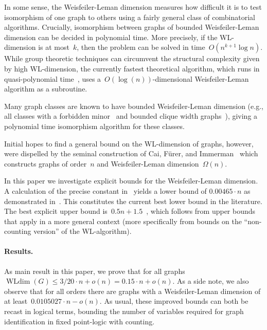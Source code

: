 \documentclass[english,a4paper]{article}
\theoremstyle{plain}
\theoremstyle{definition}
\DeclareMathOperator*{\WLdim}{WLdim}
\newcommand{\wldim}[1]{\ensuremath{\WLdim\left(#1\right)}}
\begin{document}
In some sense, the Weisfeiler-Leman dimension measures how difficult it is to test isomorphism of one graph to others using a fairly general class of combinatorial algorithms.
Crucially, isomorphism between graphs of bounded Weisfeiler-Leman dimension can be decided in polynomial time. More precisely, if the WL-dimension is at most~$k$, then the problem can be solved in time~$O(n^{k+1}\log n)$.
While group theoretic techniques can circumvent the structural complexity given by high WL-dimension, the currently fastest theoretical algorithm, which runs in quasi-polynomial time~\cite{DBLP:conf/stoc/Babai16}, uses a~$O(\log(n))$-dimensional Weisfeiler-Leman algorithm as a subroutine.

Many graph classes are known to have bounded Weisfeiler-Leman dimension (e.g., all classes with a forbidden minor~\cite{DBLP:books/cu/G2017} and bounded clique width graphs~\cite{DBLP:journals/tocl/GroheN23}), giving a polynomial time isomorphism algorithm for these classes.

Initial hopes to find a general bound on the WL-dimension
of graphs, however, were dispelled by the seminal construction of  Cai, F\"{u}rer, and Immerman~\cite{DBLP:journals/combinatorica/CaiFI92} which constructs graphs of order~$n$ and Weisfeiler-Leman dimension~$\Omega(n)$.

In this paper we investigate explicit bounds for the Weisfeiler-Leman dimension. A calculation of the precise constant in~\cite{DBLP:journals/combinatorica/CaiFI92} yields a lower bound of $0.00465\cdot n$ as demonstrated in~\cite{DBLP:journals/dam/PikhurkoVV06,DBLP:conf/asl/PikhurkoV09}. This constitutes the current best lower bound in the literature. The best explicit upper bound is~$0.5 n + 1.5$~\cite{DBLP:journals/dam/PikhurkoVV06,DBLP:conf/asl/PikhurkoV09}, which follows from upper bounds that apply in a more general context (more specifically from bounds on the ``non-counting version'' of the WL-algorithm).

\paragraph{Results.} As main result in this paper, we prove that for all graphs $\wldim{G}\leq 3/20\cdot  n + o(n)= 0.15 \cdot  n + o(n)$.
As a side note, we also observe that for all orders there are graphs with a Weisfeiler-Leman dimension of at least~$ 0.0105027 \cdot n -o(n)$. As usual, these improved bounds can both be recast in logical terms, bounding the number of variables required for graph identification in fixed point-logic with counting.
\end{document}
